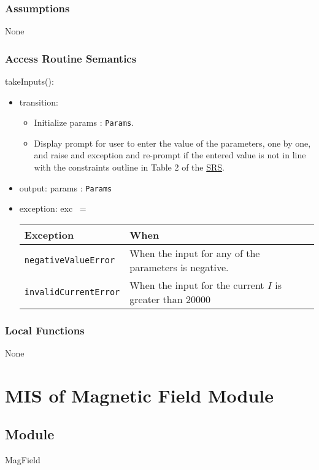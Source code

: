 \documentclass[12pt, titlepage]{article}
\begin{document}
\subsubsection{Assumptions}
None 

\subsubsection{Access Routine Semantics}

\noindent takeInputs():
\begin{itemize}
\item transition: 
\begin{itemize}
  \item Initialize params : \texttt{Params}. 
  \item Display prompt for user to enter the value of the parameters, one by one, and raise and exception and re-prompt if the entered value is not in line with the constraints outline in Table 2 of the \href{https://github.com/husseinsd1/optimal-em-arrangement/blob/main/docs/SRS/SRS.pdf}{SRS}. 
\end{itemize} 
\item output: params : \texttt{Params} 
\item exception: exc $\:=$
\begin{center}
  \begin{tabular}{p{5cm} p{4cm}}
  \hline
  \textbf{Exception} & \textbf{When} \\
  \hline
  \texttt{negativeValueError} & When the input for any of the parameters is negative.  \\
  \hline
  \texttt{invalidCurrentError} & When the input for the current $I$ is greater than 20000  \\
  \hline
  \end{tabular}
  \end{center}
\end{itemize}

\subsubsection{Local Functions}
None

\newpage

\section{MIS of Magnetic Field Module} \label{MISMagField}
\subsection{Module}
MagField
\end{document}
